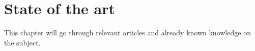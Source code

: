 \chapter{State of the art}
This chapter will go through relevant articles and already known knowledge on the subject.